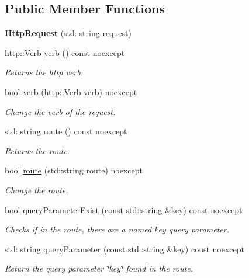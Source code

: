 \subsection*{Public Member Functions}
\begin{DoxyCompactItemize}
\item 
\mbox{\label{classHttpRequest_a5b93c0ff7316f034cb556da01dd4e44c}} 
{\bfseries Http\+Request} (std\+::string request)
\item 
http\+::\+Verb \hyperlink{classHttpRequest_aded380ba96f29fb1cc6da1679a975dd8}{verb} () const noexcept
\begin{DoxyCompactList}\small\item\em Returns the http verb. \end{DoxyCompactList}\item 
bool \hyperlink{classHttpRequest_a243897d5dd8ba0195ce0acb6e9dd79ae}{verb} (http\+::\+Verb verb) noexcept
\begin{DoxyCompactList}\small\item\em Change the verb of the request. \end{DoxyCompactList}\item 
std\+::string \hyperlink{classHttpRequest_a313930a1717c2635ad092b7f6c7d2460}{route} () const noexcept
\begin{DoxyCompactList}\small\item\em Returns the route. \end{DoxyCompactList}\item 
bool \hyperlink{classHttpRequest_aa71843738db71fe1f826bd30fbf5bb29}{route} (std\+::string route) noexcept
\begin{DoxyCompactList}\small\item\em Change the route. \end{DoxyCompactList}\item 
bool \hyperlink{classHttpRequest_a81ce6a379efeba53bd3d40699462628b}{query\+Parameter\+Exist} (const std\+::string \&key) const noexcept
\begin{DoxyCompactList}\small\item\em Checks if in the route, there are a named \textquotesingle{}key\textquotesingle{} query parameter. \end{DoxyCompactList}\item 
std\+::string \hyperlink{classHttpRequest_a10cef7d5ff51ddc7eb5ebd2f25a0f66c}{query\+Parameter} (const std\+::string \&key) const noexcept
\begin{DoxyCompactList}\small\item\em Return the query parameter \char`\"{}key\char`\"{} found in the route. \end{DoxyCompactList}\item 

\end{DoxyCompactItemize}
